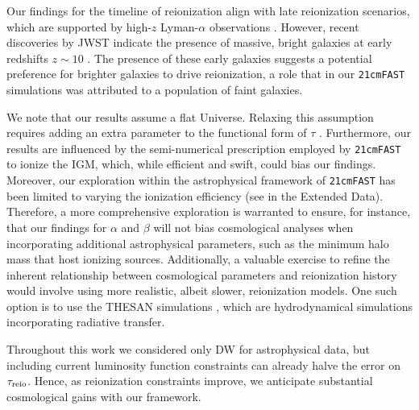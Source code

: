 Our findings for the timeline of reionization align with late
reionization scenarios, which are supported by high-$z$ Lyman-$\alpha$
observations \cite{Keating2020, Cain2021}.
However, recent discoveries by JWST indicate the presence of massive,
bright galaxies at early redshifts $z \sim 10$ \cite{Adams2023,
Bradley2023, Donnan2023}.
The presence of these early galaxies suggests a potential preference for
brighter galaxies to drive reionization, a role that in our
\texttt{21cmFAST} simulations was attributed to a population of faint
galaxies.

We note that our results assume a flat Universe.
Relaxing this assumption requires adding an extra parameter to the
functional form of $\tau$ \cite{Anselmi2023}.
Furthermore, our results are influenced by the semi-numerical
prescription employed by \texttt{21cmFAST} to ionize the IGM, which,
while efficient and swift, could bias our findings.
Moreover, our exploration within the astrophysical framework of
\texttt{21cmFAST} has been limited to varying the ionization efficiency
(see  in the Extended Data).
Therefore, a more comprehensive exploration is warranted to ensure, for
instance, that our findings for $\alpha$ and $\beta$ will not bias
cosmological analyses when incorporating additional astrophysical
parameters, such as the minimum halo mass that host ionizing sources.
Additionally, a valuable exercise to refine the inherent relationship
between cosmological parameters and reionization history would involve
using more realistic, albeit slower, reionization models.
One such option is to use the THESAN simulations \cite{Kannan2022},
which are hydrodynamical simulations incorporating radiative transfer.

Throughout this work we considered only DW for astrophysical data,
but including current luminosity function constraints can already halve
the error on $\tau_{\mathrm{reio}}$.
Hence, as reionization constraints improve, we anticipate substantial
cosmological gains with our framework.
